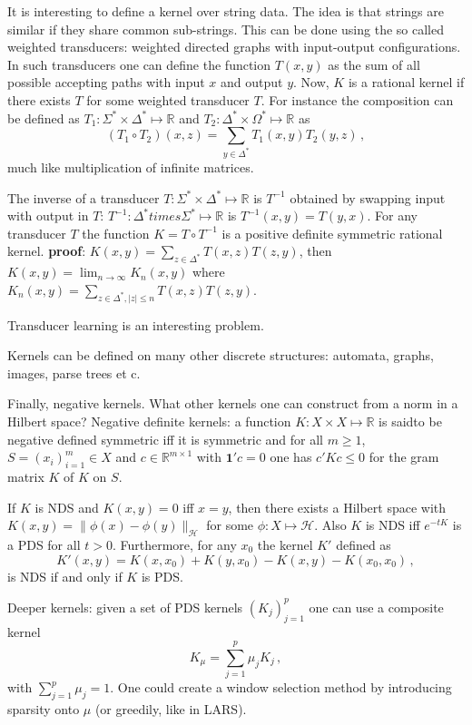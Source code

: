 \documentclass[a4paper]{article}
\newcommand{\Real}{\mathbb{R}}
\newcommand{\one}{\mathbf{1}}
\newcommand{\Hcal}{\mathcal{H}}
\begin{document}
It is interesting to define a kernel over string data. The idea is that strings
are similar if they share common sub-strings. This can be done using the so called
weighted transducers: weighted directed graphs with input-output configurations.
In such transducers one can define the function $T(x,y)$ as the sum of all possible
accepting paths with input $x$ and output $y$.
Now, $K$ is a rational kernel if there exists $T$ for some weighted transducer $T$.
For instance the composition can be defined as $T_1:\Sigma^*\times \Delta^* \mapsto \Real$
and $T_2:\Delta^*\times\Omega^* \mapsto \Real$ as
\[ (T_1\circ T_2)(x, z) = \sum_{y\in \Delta^*} T_1(x, y) T_2(y, z) \,, \]
much like multiplication of infinite matrices.

The inverse of a transducer $T:\Sigma^*\times \Delta^* \mapsto \Real$ is $T^{-1}$
obtained by swapping input with output in $T$: $T^{-1}:\Delta^* times \Sigma^*\mapsto \Real$
is $T^{-1}(x, y) = T(y, x)$.
For any transducer $T$ the function $K = T\circ T^{-1}$ is a positive definite symmetric
rational kernel.
\textbf{proof}: $K(x, y) = \sum_{z\in \Delta^*} T(x, z) T(z, y)$, then
$K(x, y) = \lim_{n\to \infty} K_n(x, y)$ where
$K_n(x, y) = \sum_{z\in\Delta^*, |z| \leq n} T(x, z) T(z, y)$.

Transducer learning is an interesting problem.

Kernels can be defined on many other discrete structures: automata, graphs, images,
parse trees et c.

Finally, negative kernels. What other kernels one can construct from a norm in a
Hilbert space? Negative definite kernels: a function $K:X\times X\mapsto\Real$
is saidto be negative defined symmetric iff it is symmetric and for all $m\geq 1$, 
$S=(x_i)_{i=1}^m\in X$ and $c\in\Real^{m\times 1}$ with $\one'c = 0$ one has
$c'Kc \leq 0$ for the gram matrix $K$ of $K$ on $S$.

If $K$ is NDS and $K(x, y) = 0$ iff $x=y$, then there exists a Hilbert space with
$K(x, y) = \|\phi(x) - \phi(y)\|_\Hcal$ for some $\phi:X\mapsto\Hcal$. Also $K$ is
NDS iff $e^{-tK}$ is a PDS for all $t>0$. Furthermore, for any $x_0$ the kernel $K'$
defined as 
\[K'(x, y) = K(x, x_0) + K(y, x_0) - K(x, y) - K(x_0, x_0) \,,\]
is NDS if and only if $K$ is PDS.

Deeper kernels: given a set of PDS kernels $(K_j)_{j=1}^p$ one can use a composite
kernel
\[K_\mu = \sum_{j=1}^p \mu_j K_j \,,\]
with $\sum_{j=1}^p \mu_j = 1$. One could create a window selection method by introducing
sparsity onto $\mu$ (or greedily, like in LARS).



%
\end{document}
